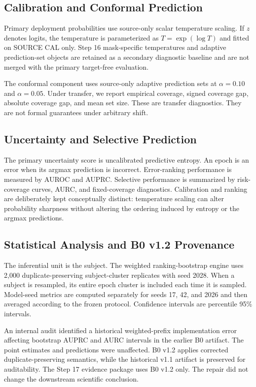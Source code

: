 \documentclass[10pt,twocolumn]{article}
\begin{document}
\subsection{Calibration and Conformal Prediction}
Primary deployment probabilities use source-only scalar temperature scaling. If $z$ denotes logits, the temperature is parameterized as $T=\exp(\log T)$ and fitted on SOURCE CAL only. Step 16 mask-specific temperatures and adaptive prediction-set objects are retained as a secondary diagnostic baseline and are not merged with the primary target-free evaluation.

The conformal component uses source-only adaptive prediction sets at $\alpha=0.10$ and $\alpha=0.05$. Under transfer, we report empirical coverage, signed coverage gap, absolute coverage gap, and mean set size. These are transfer diagnostics. They are not formal guarantees under arbitrary shift.

\subsection{Uncertainty and Selective Prediction}
The primary uncertainty score is uncalibrated predictive entropy. An epoch is an error when its argmax prediction is incorrect. Error-ranking performance is measured by AUROC and AUPRC. Selective performance is summarized by risk-coverage curves, AURC, and fixed-coverage diagnostics. Calibration and ranking are deliberately kept conceptually distinct: temperature scaling can alter probability sharpness without altering the ordering induced by entropy or the argmax predictions.

\subsection{Statistical Analysis and B0 v1.2 Provenance}
The inferential unit is the subject. The weighted ranking-bootstrap engine uses 2,000 duplicate-preserving subject-cluster replicates with seed 2028. When a subject is resampled, its entire epoch cluster is included each time it is sampled. Model-seed metrics are computed separately for seeds 17, 42, and 2026 and then averaged according to the frozen protocol. Confidence intervals are percentile 95\% intervals.

An internal audit identified a historical weighted-prefix implementation error affecting bootstrap AUPRC and AURC intervals in the earlier B0 artifact. The point estimates and predictions were unaffected. B0 v1.2 applies corrected duplicate-preserving semantics, while the historical v1.1 artifact is preserved for auditability. The Step 17 evidence package uses B0 v1.2 only. The repair did not change the downstream scientific conclusion.
\end{document}
